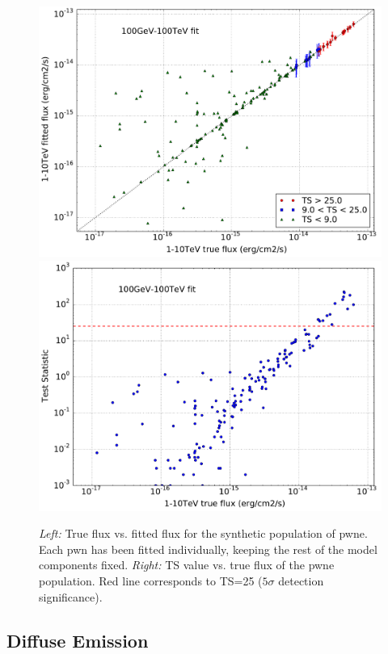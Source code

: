 \documentclass[main.tex]{subfiles}
\begin{document}
\begin{figure}[h]
\centering
{}
\includegraphics[width=1\textwidth]{Pictures/PWNe-only_Flux_100GeV-100TeV_Asimov.pdf}
\endminipage 
{}
\includegraphics[width=1\textwidth]{Pictures/PWNe-only_TS_100GeV-100TeV_Asimov.pdf}
\endminipage
  \caption{\textit{Left:} True flux vs. fitted flux for the synthetic population of \gls{pwne}. Each \gls{pwn} has been fitted individually, keeping the rest of the model components fixed. \textit{Right:} TS value vs. true flux of the \gls{pwne} population. Red line corresponds to TS=25 ($5\sigma$ detection significance).}
    \label{fig:pwnepopresults}
\end{figure}

\subsection{Diffuse Emission}
\end{document}
